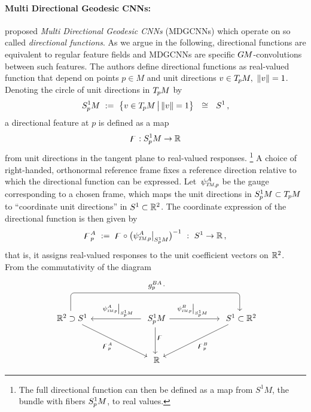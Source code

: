 \paragraph{Multi Directional Geodesic CNNs:}
\citet{poulenard2018multi} proposed \emph{Multi Directional Geodesic CNNs} (MDGCNNs) which operate on so called \emph{directional functions}.
As we argue in the following, directional functions are equivalent to regular feature fields and MDGCNNs are specific $G\mkern-1.4muM$-convolutions between such features.
The authors define directional functions as real-valued function that depend on points $p\in M$ and unit directions $v\in T_{\mkern-1.5mu p}\mkern-.5muM,\ \lVert v\rVert=1$.
Denoting the circle of unit directions in $T_{\mkern-1.5mu p}\mkern-.5muM$ by
\begin{align}
    \SpM\ :=\ \big\{ v\in\TpM \,\big|\, \lVert v\rVert = 1 \big\} \ \ \cong\ \ S^1 \,,
\end{align}
a directional feature at $p$ is defined as a map
\begin{align}
    \digamma: S^1_{\mkern-.5mu p}\mkern-.5muM \to \mathbb{R}
\end{align}
from unit directions in the tangent plane to real-valued responses.%
\footnote{
    The full directional function can then be defined as a map from ${S^1\!M}$, the bundle with fibers $S^1_{\mkern-.5mu p}\mkern-.5muM$, to real values.
}
A choice of right-handed, orthonormal reference frame fixes a reference direction relative to which the directional function can be expressed.
Let~$\psiTMp^A$ be the gauge corresponding to a chosen frame, which maps the unit directions in $S^1_{\mkern-.5mu p}\mkern-.5muM \subset T_{\mkern-1.5mu p}\mkern-.5muM$ to ``coordinate unit directions'' in $S^1 \subset \mathbb{R}^2$.
The coordinate expression of the directional function is then given by
\begin{align}\label{eq:directional_functions_trafo_law_regular}
    \digamma_p^A\ :=\ \digamma \circ \big(\psiTMp^A \big|_{\SpM} \big)^{-1}\ :\ S^1 \to \R \,,
\end{align}
that is, it assigns real-valued responses to the unit coefficient vectors on $\mathbb{R}^2$.
From the commutativity of the diagram
\begin{equation}\label{cd:directional_function_trafo_law}
\begin{tikzcd}[column sep=60, row sep=32, font=\normalsize]
    \R^2 \supset S^1
        \arrow[rr, rounded corners, to path={ 
                -- ([yshift=5.ex]\tikztostart.north) 
                --node[above, pos=.5]{\small$g_p^{BA} \mkern2mu\cdot$} ([yshift=5.ex]\tikztotarget.north) 
                -- (\tikztotarget.north)
                }]
        \arrow[dr, "\digamma_p^A"']
    & \SpM
        \arrow[d, pos=.4, "\digamma"]
        \arrow[l, pos=.46, "\psiTMp^A \big|_{\SpM}"']
        \arrow[r, pos=.46, "\psiTMp^B \big|_{\SpM}"]
    &  S^1 \subset \R^2
        \arrow[dl, "\digamma_p^B"]
    \\
    & \R
\end{tikzcd}
\end{equation}
